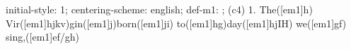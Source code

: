 initial-style: 1;
centering-scheme: english;
def-m1: \grealign;
(c4) 1. The([em1]h) Vir([em1]hjkv)gin([em1]j)born([em1]ji) to([em1]hg)day([em1]hjIH) we([em1]gf) sing,([em1]ef/gh)